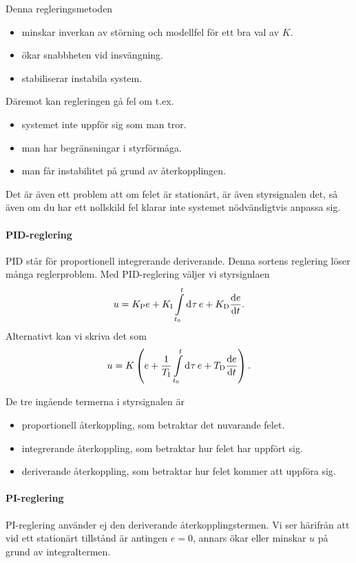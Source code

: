 Denna regleringsmetoden
\begin{itemize}
	\item minskar inverkan av störning och modellfel för ett bra val av $K$.
	\item ökar snabbheten vid insvängning.
	\item stabiliserar instabila system.
\end{itemize}
Däremot kan regleringen gå fel om t.ex.
\begin{itemize}
	\item systemet inte uppför sig som man tror.
	\item man har begränsningar i styrförmåga.
	\item man får instabilitet på grund av återkopplingen.
\end{itemize}

Det är även ett problem att om felet är stationärt, är även styrsignalen det, så även om du har ett nollskild fel klarar inte systemet nödvändigtvis anpassa sig.

\paragraph{PID-reglering}
PID står för proportionell integrerande deriverande. Denna sortens reglering löser många reglerproblem. Med PID-reglering väljer vi styrsignlaen
\begin{align*}
	u = K_{\text{P}}e + K_{\text{I}}\int\limits_{t_{0}}^{t}\dd[]{\tau}e + K_{\text{D}}\dv{e}{t}.
\end{align*}
Alternativt kan vi skriva det som
\begin{align*}
	u = K\left(e + \frac{1}{T_{\text{I}}}\int\limits_{t_{0}}^{t}\dd[]{\tau}e + T_{\text{D}}\dv{e}{t}\right).
\end{align*}

De tre ingående termerna i styrsignalen är
\begin{itemize}
	\item proportionell återkoppling, som betraktar det nuvarande felet.
	\item integrerande återkoppling, som betraktar hur felet har uppfört sig.
	\item deriverande återkoppling, som betraktar hur felet kommer att uppföra sig.
\end{itemize}

\paragraph{PI-reglering}
PI-reglering använder ej den deriverande återkopplingstermen. Vi ser härifrån att vid ett stationärt tillstånd är antingen $e = 0$, annars ökar eller minskar $u$ på grund av integraltermen.

